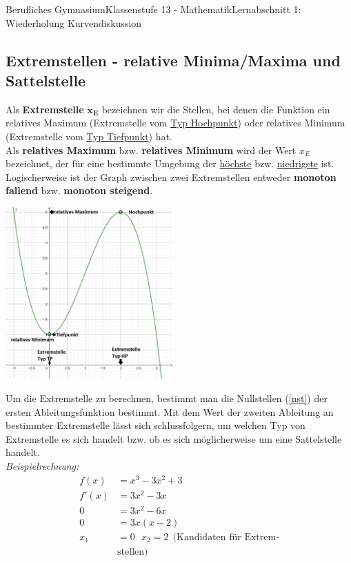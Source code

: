 \documentclass[11pt,twocolumn,oneside,openany,headings=optiontotoc,11pt,numbers=noenddot]{article}
\begin{document}
\begin{worksheet}{Berufliches Gymnasium}{Klassenstufe 13 - Mathematik}{Lernabschnitt 1: Wiederholung Kurvendiskussion}
		\subsection{Extremstellen - relative Minima/Maxima und Sattelstelle}
		Als \textbf{Extremstelle} \(\mathbf{x_E}\) bezeichnen wir die Stellen, bei denen die Funktion ein relatives Maximum (Extremstelle vom \underline{Typ Hochpunkt}) oder relatives Minimum (Extremstelle vom \underline{Typ Tiefpunkt}) hat.\\
		Als \textbf{relatives Maximum} bzw. \textbf{relatives Minimum} wird der Wert \(x_E\) bezeichnet, der für eine bestimmte Umgebung der \underline{höchste} bzw. \underline{niedrigste} ist.\\
		Logischerweise ist der Graph zwischen zwei Extremstellen entweder \textbf{monoton fallend} bzw. \textbf{monoton steigend}.\\
		\par\bigskip\noindent
		\includegraphics[width=0.48\textwidth]{../99_Bilder/00_Wdh/EP.png}\\
		\par\bigskip\noindent
		Um die Extremstelle zu berechnen, bestimmt man die Nullstellen (\ref{nst}) der ersten Ableitungsfunktion bestimmt. Mit dem Wert der zweiten Ableitung an bestimmter Extremstelle lässt sich schlussfolgern, um welchen Typ von Extremstelle es sich handelt bzw. ob es sich möglicherweise um eine Sattelstelle handelt.\\
		\textit{Beispielrechnung:}
		\begin{align*}
			f(x) & = x^3 - 3x^2 +3\\
			f'(x) & = 3x^2 - 3x\\
			0 & = 3x^2 - 6x\\
			0 & = 3x(x-2)\\
			x_1 & = 0\ \ \ x_2=2\ \ (\text{Kandidaten für Extrem-}\\
			& \text{stellen})

\end{align*}
\end{worksheet}
\end{document}
